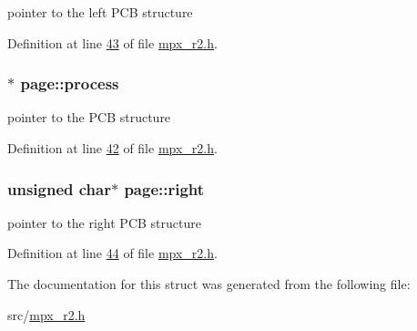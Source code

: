 pointer to the left PCB structure 



Definition at line \hyperlink{mpx__r2_8h_source_l00043}{43} of file \hyperlink{mpx__r2_8h_source}{mpx\_\-r2.h}.

\hypertarget{structpage_af3cc0e1320b79159b230f154f1a95f0d}{
\subsubsection[{process}]{$\ast$ {\bf page::process}}}
\label{structpage_af3cc0e1320b79159b230f154f1a95f0d}


pointer to the PCB structure 



Definition at line \hyperlink{mpx__r2_8h_source_l00042}{42} of file \hyperlink{mpx__r2_8h_source}{mpx\_\-r2.h}.

\hypertarget{structpage_a59bb1b5eca2d579befcc93a2833f4dfd}{
\subsubsection[{right}]{\setlength{\rightskip}{0pt plus 5cm}unsigned char$\ast$ {\bf page::right}}}
\label{structpage_a59bb1b5eca2d579befcc93a2833f4dfd}


pointer to the right PCB structure 



Definition at line \hyperlink{mpx__r2_8h_source_l00044}{44} of file \hyperlink{mpx__r2_8h_source}{mpx\_\-r2.h}.



The documentation for this struct was generated from the following file:\begin{DoxyCompactItemize}
\item 
src/\hyperlink{mpx__r2_8h}{mpx\_\-r2.h}\end{DoxyCompactItemize}
